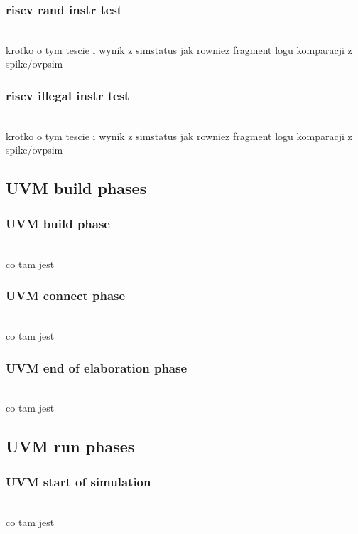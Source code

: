 \documentclass[11pt,a4paper]{article}
\begin{document}
		\subsubsection{riscv rand instr test}
		\hspace{5mm}
			\\krotko o tym tescie i wynik z simstatus jak rowniez fragment logu komparacji z spike/ovpsim
			
		\subsubsection{riscv illegal instr test}
		\hspace{5mm}
			\\krotko o tym tescie i wynik z simstatus jak rowniez fragment logu komparacji z spike/ovpsim

	\subsection{UVM build phases}
	
		\subsubsection{UVM build phase}
		\hspace{5mm}
			\\co tam jest
			
		\subsubsection{UVM connect phase}
		\hspace{5mm}
			\\co tam jest
	
		\subsubsection{UVM end of elaboration phase}
		\hspace{5mm}
			\\co tam jest	
	
	\subsection{UVM run phases}

		\subsubsection{UVM start of simulation}
		\hspace{5mm}
			\\co tam jest	
\end{document}
